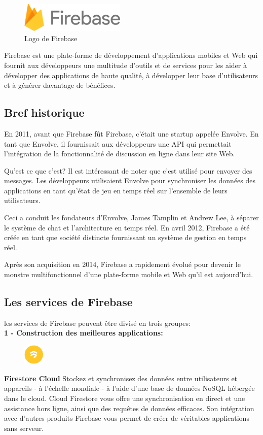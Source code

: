 \begin{figure}
	\includegraphics[width=5cm]{Images/chapter2/firebase_logo.png}
	\caption{{\footnotesize Logo de Firebase}}
\end{figure}

Firebase est une plate-forme de développement d'applications mobiles et Web qui fournit aux développeurs une multitude d'outils et de services pour les aider à développer des applications de haute qualité, à développer leur base d'utilisateurs et à générer davantage de bénéfices.\cite{geekyants_introduction_2017}
\newpage

\subsection{Bref historique}
En 2011, avant que Firebase fût Firebase, c'était une startup appelée Envolve. En tant que Envolve, il fournissait aux développeurs une API qui permettait l'intégration de la fonctionnalité de discussion en ligne dans leur site Web.

Qu'est ce que c'est? Il est intéressant de noter que c'est utilisé pour envoyer des messages. Les développeurs utilisaient Envolve pour synchroniser les données des applications en tant qu'état de jeu en temps réel sur l'ensemble de leurs utilisateurs.

Ceci a conduit les fondateurs d’Envolve, James Tamplin et Andrew Lee, à séparer le système de chat et l’architecture en temps réel. En avril 2012, Firebase a été créée en tant que société distincte fournissant un système de gestion en temps réel.

Après son acquisition en 2014, Firebase a rapidement évolué pour devenir le monstre multifonctionnel d’une plate-forme mobile et Web qu’il est aujourd’hui.

\subsection{Les services de Firebase}
les services de Firebase peuvent être divisé en trois groupes:\bigskip\\
\longtab \textbf{1 - Construction des meilleures applications:}\bigskip

\begin{figure}
	\includegraphics[width=1cm]{Images/chapter2/firebase_services/firestore.png}
\end{figure}
\textbf{Firestore Cloud} Stockez et synchronisez des données entre utilisateurs et appareils - à l'échelle mondiale - à l'aide d'une base de données NoSQL hébergée dans le cloud. Cloud Firestore vous offre une synchronisation en direct et une assistance hors ligne, ainsi que des requêtes de données efficaces. Son intégration avec d'autres produits Firebase vous permet de créer de véritables applications sans serveur.\medskip

